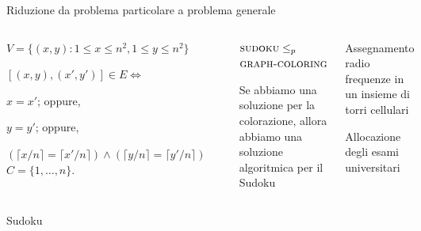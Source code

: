 \begin{frame}{Riduzione da problema particolare a problema generale}

\small
\vspace{-17pt}
\begin{columns}[T]
\begin{myboxtitle}
\noindent
$V=\{ (x,y) : 1 \leq x \leq n^2, 1 \leq y \leq n^2 \}$

\smallskip\noindent
$[(x,y), (x',y')] \in E \Leftrightarrow {}$
\BI
\item $x=x'$; oppure,
\item $y=y'$; oppure,
\item $(\lceil x/n \rceil = \lceil x'/n \rceil) \wedge (\lceil y/n \rceil = \lceil y'/n \rceil)$
\EI
\smallskip\noindent
$C = \{1, \ldots, n \}$.
\end{myboxtitle}

\vspace{-9pt}
\begin{center}
\end{center}

\begin{myboxtitle}[Riduzione]
$\textsc{sudoku} \leq_p {}$\\
$\textsc{graph-coloring}$

\smallskip
Se abbiamo una soluzione per la colorazione, allora abbiamo una soluzione algoritmica per il Sudoku
\end{myboxtitle}

\begin{myboxtitle}[Applicazioni]
\noindent
Assegnamento radio frequenze in un insieme di torri cellulari

\medskip\noindent
Allocazione degli esami universitari
\end{myboxtitle}

\end{columns}

\end{frame}

\begin{frame}{Sudoku}
	

\end{frame}


